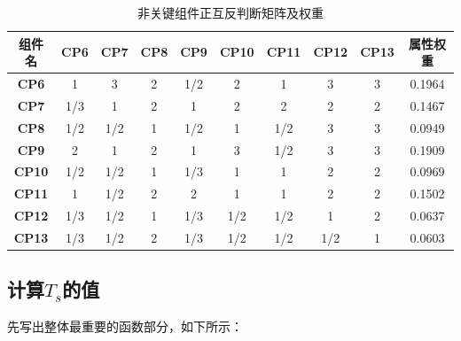 \documentclass[14pt,a4paper,UTF8,twoside]{article}
\begin{document}
  \begin{table}[H]
    \centering
    \caption{非关键组件正互反判断矩阵及权重}
    \label{tab:non_critical_weights}
    \begin{tabular}{|c|c|c|c|c|c|c|c|c|c|}
    \hline
    \textbf{组件名} & \textbf{CP6} & \textbf{CP7} & \textbf{CP8} & \textbf{CP9} & \textbf{CP10} & \textbf{CP11} & \textbf{CP12} & \textbf{CP13} & \textbf{属性权重} \\ \hline
    \textbf{CP6}   & 1            & 3            & 2            & 1/2          & 2             & 1             & 3             & 3             & 0.1964           \\ \hline
    \textbf{CP7}   & 1/3          & 1            & 2            & 1            & 2             & 2             & 2             & 2             & 0.1467           \\ \hline
    \textbf{CP8}   & 1/2          & 1/2          & 1            & 1/2          & 1             & 1/2           & 3             & 3             & 0.0949           \\ \hline
    \textbf{CP9}   & 2            & 1            & 2            & 1            & 3             & 1/2           & 3             & 3             & 0.1909           \\ \hline
    \textbf{CP10}  & 1/2          & 1/2          & 1            & 1/3          & 1             & 1             & 2             & 2             & 0.0969           \\ \hline
    \textbf{CP11}  & 1            & 1/2          & 2            & 2            & 1             & 1             & 2             & 2             & 0.1502           \\ \hline
    \textbf{CP12}  & 1/3          & 1/2          & 1            & 1/3          & 1/2           & 1/2           & 1             & 2             & 0.0637           \\ \hline
    \textbf{CP13}  & 1/3          & 1/2          & 2            & 1/3          & 1/2           & 1/2           & 1/2           & 1             & 0.0603           \\ \hline
    \end{tabular}
\end{table}


\subsection{计算$T_s$的值}

先写出整体最重要的函数部分，如下所示：
\end{document}
